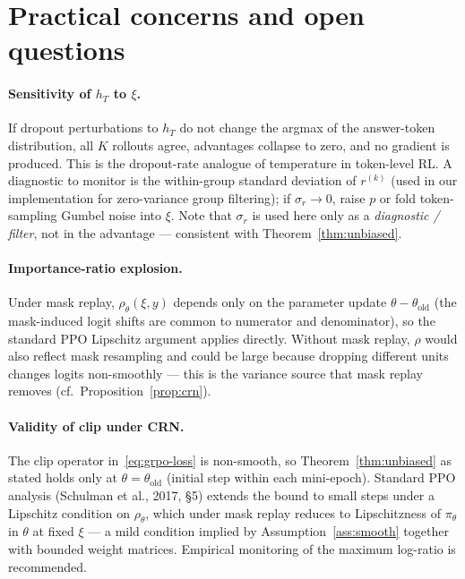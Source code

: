 \documentclass[11pt]{article}
\theoremstyle{definition}
\theoremstyle{remark}
\newcommand{\old}{\mathrm{old}}
\begin{document}
\section{Practical concerns and open questions}

\paragraph{Sensitivity of $h_T$ to $\xi$.}
If dropout perturbations to $h_T$ do not change the argmax of the
answer-token distribution, all $K$ rollouts agree, advantages collapse to
zero, and no gradient is produced.  This is the dropout-rate analogue of
temperature in token-level RL.  A diagnostic to monitor is the
within-group standard deviation of $r^{(k)}$ (used in our implementation
for zero-variance group filtering); if $\sigma_r \to 0$, raise $p$ or fold
token-sampling Gumbel noise into $\xi$.  Note that $\sigma_r$ is used here
only as a \emph{diagnostic / filter}, not in the advantage --- consistent
with Theorem~\ref{thm:unbiased}.

\paragraph{Importance-ratio explosion.}
Under mask replay, $\rho_\theta(\xi,y)$ depends only on the parameter
update $\theta - \theta_\old$ (the mask-induced logit shifts are common
to numerator and denominator), so the standard PPO Lipschitz argument
applies directly.  Without mask replay, $\rho$ would also reflect mask
resampling and could be large because dropping different units changes
logits non-smoothly --- this is the variance source that mask replay
removes (cf.\ Proposition~\ref{prop:crn}).

\paragraph{Validity of clip under CRN.}
The clip operator in~\eqref{eq:grpo-loss} is non-smooth, so
Theorem~\ref{thm:unbiased} as stated holds only at $\theta = \theta_\old$
(initial step within each mini-epoch).  Standard PPO analysis (Schulman
et al., 2017, \S 5) extends the bound to small steps under a Lipschitz
condition on $\rho_\theta$, which under mask replay reduces to
Lipschitzness of $\pi_\theta$ in $\theta$ at fixed $\xi$ --- a mild
condition implied by Assumption~\ref{ass:smooth} together with bounded
weight matrices.  Empirical monitoring of the maximum log-ratio is
recommended.
\end{document}
